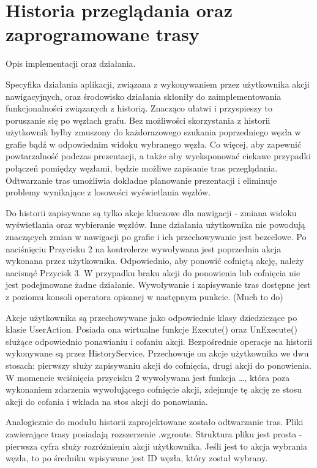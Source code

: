 \section{Historia przeglądania oraz zaprogramowane trasy}
Opis implementacji oraz działania.

Specyfika działania aplikacji, związana z wykonywaniem przez użytkownika akcji nawigacyjnych, oraz środowisko działania skłoniły do zaimplementowania funkcjonalności związanych z historią. Znacząco ułatwi i przyspieszy to poruszanie się po węzłach grafu. Bez możliwości skorzystania z historii użytkownik byłby zmuszony do każdorazowego szukania poprzedniego węzła  w grafie bądź w odpowiednim widoku wybranego węzła. Co więcej, aby zapewnić powtarzalność podczas prezentacji, a także aby wyeksponować ciekawe przypadki połączeń pomiędzy węzłami, będzie możliwe zapisanie tras przeglądania. Odtwarzanie tras umożliwia dokładne planowanie prezentacji i eliminuje problemy wynikające z losowości wyświetlania węzłów. 

Do historii zapisywane są tylko akcje kluczowe dla nawigacji - zmiana widoku wyświetlania oraz wybieranie węzłów. Inne działania użytkownika nie powodują znaczących zmian w nawigacji po grafie i ich przechowywanie jest bezcelowe. Po naciśnięciu Przycisku 2 na kontrolerze wywoływana jest poprzednia akcja wykonana przez użytkownika. Odpowiednio, aby ponowić cofniętą akcję, należy nacisnąć Przycisk 3. W przypadku braku akcji do ponowienia lub cofnięcia nie jest podejmowane żadne działanie. Wywoływanie i zapisywanie tras dostępne jest z poziomu konsoli operatora opisanej w następnym punkcie. (Much to do)

Akcje użytkownika są przechowywane jako odpowiednie klasy dziedziczące po klasie UserAction. Posiada ona wirtualne funkcje Execute() oraz UnExecute() służące odpowiednio ponawianiu i cofaniu akcji. Bezpośrednie operacje na historii wykonywane są przez HistoryService. Przechowuje on akcje użytkownika we dwu stosach: pierwszy służy zapisywaniu akcji do cofnięcia, drugi akcji do ponowienia. W momencie wciśnięcia przycisku 2 wywoływana jest funkcja …, która poza wykonaniem zdarzenia wywołującego cofnięcie akcji, zdejmuje tę akcję ze stosu akcji do cofania i wkłada na stos akcji do ponawiania.

Analogicznie do modułu historii zaprojektowane zostało odtwarzanie tras. Pliki zawierające trasy posiadają rozszerzenie .wgroute. Struktura pliku jest prosta - pierwsza cyfra służy rozróżnieniu akcji użytkownika. Jeśli jest to akcja wybrania węzła, to po średniku wpisywane jest ID węzła, który został wybrany. 



